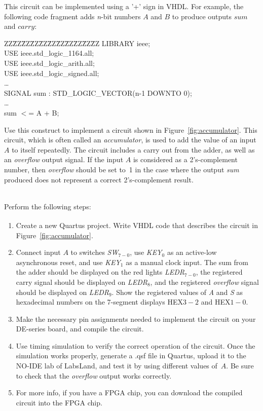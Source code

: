\documentclass[epsfig,10pt,fullpage]{article}
\begin{document}
This circuit can be implemented using a '+' sign in VHDL. For example, the following code fragment adds {\it n}-bit numbers $A$ and $B$ to produce outputs $sum$ and $carry$:

\begin{center}
\begin{minipage}[t]{12.5 cm}
\begin{tabbing}
ZZ\=ZZ\=ZZ\=ZZ\=ZZ\=ZZ\=ZZ\=ZZ\=ZZ\=ZZ\=ZZ\kill
\>LIBRARY ieee;\\
\>USE ieee.std\_logic\_1164.all;\\
\>USE ieee.std\_logic\_arith.all;\\
\>USE ieee.std\_logic\_signed.all;\\
\>\ldots \\
\>SIGNAL sum : STD\_LOGIC\_VECTOR(n-1 DOWNTO 0);\\
\>\ldots \\
\>sum $<$= A + B;\\
\end{tabbing}
\end{minipage}
\end{center}

Use this construct to implement a circuit shown in Figure~\ref{fig:accumulator}. This
circuit, which is often called an {\it accumulator}, is used to add the value of an input
$A$ to itself repeatedly. The circuit includes a carry out from the adder, as well as an
{\it overflow} output signal. If the input $A$ is considered as a 2's-complement number, 
then {\it overflow} should be set to~1
in the case where the output {\it sum} produced does not represent a correct
2's-complement result.

~\\
Perform the following steps:
\begin{enumerate}
\item Create a new Quartus\textsuperscript{\textregistered} project. Write VHDL code that describes the 
circuit in Figure~\ref{fig:accumulator}.
\item Connect input $A$ to switches {\it SW}$_{7-0}$, use {\it KEY}$_0$ as an 
active-low asynchronous reset, and use {\it KEY}$_1$ as a manual clock input. The sum 
from the adder should be displayed on the red lights {\it LEDR}$_{7-0}$, the registered 
carry signal should be displayed on {\it LEDR}$_{8}$, and the registered {\it overflow} 
signal should be displayed on {\it LEDR}$_{9}$. Show the registered values of {\it A}
and {\it S} as hexadecimal numbers on the 7-segment displays HEX$3-2$ and HEX$1-0$. 
\item Make the necessary pin assignments needed to implement the circuit on your
DE-series board, and compile the circuit.
\item Use timing simulation to verify the correct operation of the
circuit. Once the simulation works properly, generate a .qsf file in Quartus, upload it to the NO-IDE lab of LabsLand, 
and test it by using different values of~$A$. Be sure to check that the {\it overflow} 
output works correctly.
\item For more info, if you have a FPGA chip, you can download the compiled circuit into the FPGA chip.
\end{enumerate}
\end{document}
